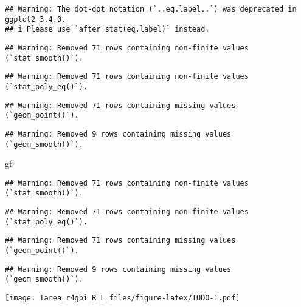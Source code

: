 \documentclass[
]{article}
\newenvironment{Shaded}{\begin{snugshade}}{\end{snugshade}}
\newcommand{\NormalTok}[1]{#1}
\begin{document}
\begin{verbatim}
## Warning: The dot-dot notation (`..eq.label..`) was deprecated in ggplot2 3.4.0.
## i Please use `after_stat(eq.label)` instead.
\end{verbatim}

\begin{verbatim}
## Warning: Removed 71 rows containing non-finite values (`stat_smooth()`).
\end{verbatim}

\begin{verbatim}
## Warning: Removed 71 rows containing non-finite values (`stat_poly_eq()`).
\end{verbatim}

\begin{verbatim}
## Warning: Removed 71 rows containing missing values (`geom_point()`).
\end{verbatim}

\begin{verbatim}
## Warning: Removed 9 rows containing missing values (`geom_smooth()`).
\end{verbatim}

\begin{Shaded}
\begin{Highlighting}[]
\NormalTok{gf}
\end{Highlighting}
\end{Shaded}

\begin{verbatim}
## Warning: Removed 71 rows containing non-finite values (`stat_smooth()`).
\end{verbatim}

\begin{verbatim}
## Warning: Removed 71 rows containing non-finite values (`stat_poly_eq()`).
\end{verbatim}

\begin{verbatim}
## Warning: Removed 71 rows containing missing values (`geom_point()`).
\end{verbatim}

\begin{verbatim}
## Warning: Removed 9 rows containing missing values (`geom_smooth()`).
\end{verbatim}

\texttt{[image: Tarea\_r4gbi\_R\_L\_files/figure-latex/TODO-1.pdf]}
\end{document}

